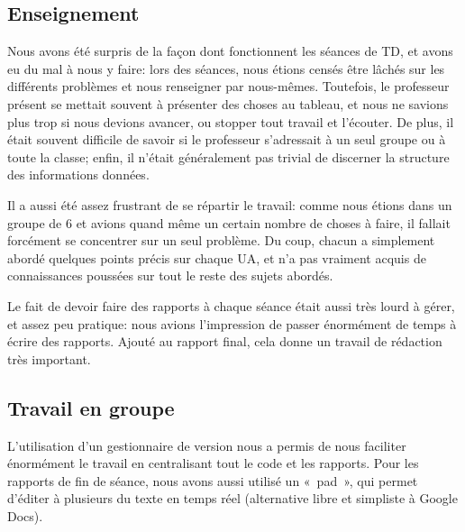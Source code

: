 
\subsection{Enseignement}

Nous avons été surpris de la façon dont fonctionnent les séances de
TD, et avons eu du mal à nous y faire: lors des séances, nous étions
censés être lâchés sur les différents problèmes et nous renseigner par
nous-mêmes.  Toutefois, le professeur présent se mettait souvent à
présenter des choses au tableau, et nous ne savions plus trop si nous
devions avancer, ou stopper tout travail et l'écouter. De plus, il
était souvent difficile de savoir si le professeur s'adressait à un
seul groupe ou à toute la classe; enfin, il n'était généralement pas
trivial de discerner la structure des informations données.

Il a aussi été assez frustrant de se répartir le travail: comme nous
étions dans un groupe de 6 et avions quand même un certain nombre de
choses à faire, il fallait forcément se concentrer sur un seul
problème. Du coup, chacun a simplement abordé quelques points précis
sur chaque UA, et n'a pas vraiment acquis de connaissances poussées
sur tout le reste des sujets abordés.

Le fait de devoir faire des rapports à chaque séance était aussi très
lourd à gérer, et assez peu pratique: nous avions l'impression de
passer énormément de temps à écrire des rapports. Ajouté au rapport
final, cela donne un travail de rédaction très important.

\subsection{Travail en groupe} %

L'utilisation d'un gestionnaire de version nous a permis de nous
faciliter énormément le travail en centralisant tout le code et les
rapports.  Pour les rapports de fin de séance, nous avons aussi
utilisé un «~pad~», qui permet d'éditer à plusieurs du texte en temps
réel (alternative libre et simpliste à Google Docs).

